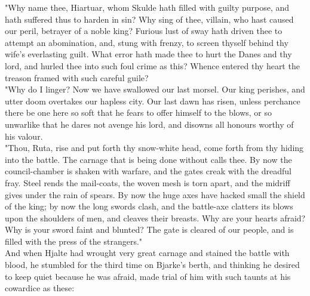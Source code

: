 \documentclass[10pt,a4paper]{report}
\begin{document}
"Why name thee, Hiartuar, whom Skulde hath filled with guilty purpose, and hath suffered thus to harden in sin? Why sing of thee, villain, who hast caused our peril, betrayer of a noble king? Furious lust of sway hath driven thee to attempt an abomination, and, stung with frenzy, to screen thyself behind thy wife's everlasting guilt. What error hath made thee to hurt the Danes and thy lord, and hurled thee into such foul crime as this? Whence entered thy heart the treason framed with such careful guile?\\

"Why do I linger? Now we have swallowed our last morsel. Our king perishes, and utter doom overtakes our hapless city. Our last dawn has risen, unless perchance there be one here so soft that he fears to offer himself to the blows, or so unwarlike that he dares not avenge his lord, and disowns all honours worthy of his valour.\\

"Thou, Ruta, rise and put forth thy snow-white head, come forth from thy hiding into the battle. The carnage that is being done without calls thee. By now the council-chamber is shaken with warfare, and the gates creak with the dreadful fray. Steel rends the mail-coats, the woven mesh is torn apart, and the midriff gives under the rain of spears. By now the huge axes have hacked small the shield of the king; by now the long swords clash, and the battle-axe clatters its blows upon the shoulders of men, and cleaves their breasts. Why are your hearts afraid? Why is your sword faint and blunted? The gate is cleared of our people, and is filled with the press of the strangers."\\

And when Hjalte had wrought very great carnage and stained the battle with blood, he stumbled for the third time on Bjarke's berth, and thinking he desired to keep quiet because he was afraid, made trial of him with such taunts at his cowardice as these:\\
\end{document}
